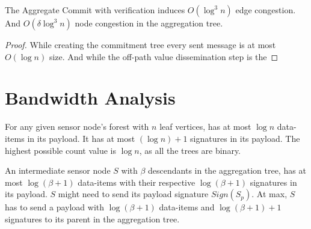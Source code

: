 	\begin{theorem}
	\cite{chan2006secure}
	The Aggregate Commit with verification induces $O(\log^3 n)$ edge congestion. And $O(\delta\log^3 n)$ node congestion in the aggregation tree.
	\end{theorem}
	\begin{proof}
		While creating the commitment tree every sent message is at most $O(\log n)$ size.
		And while the off-path value dissemination step is the
	\end{proof}


\section{Bandwidth Analysis}
	For any given sensor node's forest with $n$ leaf vertices, has at most $\log n$ data-items in its payload.
	It has at most $(\log n) +1$ signatures in its payload.
	The highest possible count value is $\log n$, as all the trees are binary. 

	An intermediate sensor node $S$ with $\beta$ descendants in the aggregation tree, has at most $\log(\beta+1)$ data-items with their respective $\log(\beta+1)$ signatures in its payload.
	$S$ might need to send its payload signature $Sign(S_{p})$.
	At max, $S$ has to send a payload with $\log(\beta+1)$ data-items and $\log(\beta+1) +1$ signatures to its parent in the aggregation tree.
	
